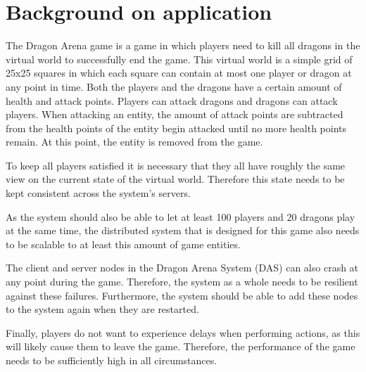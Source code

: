 \section{Background on application}

The Dragon Arena game is a game in which players need to kill all dragons in the virtual world to successfully end the game. 
This virtual world is a simple grid of 25x25 squares in which each square can contain at most one player or dragon at any point in time. 
Both the players and the dragons have a certain amount of health and attack points. 
Players can attack dragons and dragons can attack players. When attacking an entity, the amount of attack points are subtracted from the health points of the entity begin attacked until no more health points remain. At this point, the entity is removed from the game.

To keep all players satisfied it is necessary that they all have roughly the same view on the current state of the virtual world. 
Therefore this state needs to be kept consistent across the system's servers.

As the system should also be able to let at least 100 players and 20 dragons play at the same time, the distributed system that is designed for this game also needs to be scalable to at least this amount of game entities.

The client and server nodes in the Dragon Arena System (DAS) can also crash at any point during the game. 
Therefore, the system as a whole needs to be resilient against these failures. 
Furthermore, the system should be able to add these nodes to the system again when they are restarted.

Finally, players do not want to experience delays when performing actions, as this will likely cause them to leave the game.
Therefore, the performance of the game needs to be sufficiently high in all circumstances.